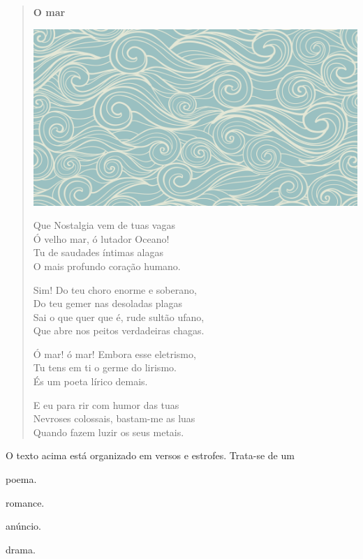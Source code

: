 \begin{myquote}
\begin{verse}
\textbf{O mar}

\includegraphics[width=.5\textwidth]{media/image42.jpeg}

Que Nostalgia vem de tuas vagas\\
Ó velho mar, ó lutador Oceano!\\
Tu de saudades íntimas alagas\\
O mais profundo coração humano.

Sim! Do teu choro enorme e soberano,\\
Do teu gemer nas desoladas plagas\\
Sai o que quer que é, rude sultão ufano,\\
Que abre nos peitos verdadeiras chagas.

Ó mar! ó mar! Embora esse eletrismo,\\
Tu tens em ti o germe do lirismo.\\
És um poeta lírico demais.

E eu para rir com humor das tuas\\
Nevroses colossais, bastam-me as luas\\
Quando fazem luzir os seus metais.
\end{verse}

\end{myquote}

O texto acima está organizado em versos e estrofes. Trata-se de
um

\begin{multicols}{2}
\begin{escolha}
  \item poema.

  \item romance.

  \item anúncio.

  \item drama.
\end{escolha}
\end{multicols}

